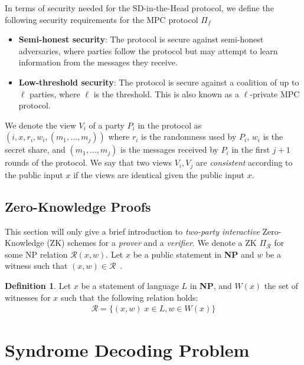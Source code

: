 \documentclass[twoside,11pt]{report}
\theoremstyle{definition}
\newtheorem{definition}{Definition}[section]
\theoremstyle{plain}
\begin{document}
In terms of security needed for the SD-in-the-Head protocol, we define the following security requirements for the MPC protocol $\Pi_f$

\begin{itemize}
  \item \textbf{Semi-honest security}: The protocol is secure against semi-honest adversaries, where parties follow the protocol but may attempt to learn information from the messages they receive.
  \item \textbf{Low-threshold security}: The protocol is secure against a coalition of up to $\ell$ parties, where $\ell$ is the threshold. This is also known as a $\ell$-private MPC protocol.
\end{itemize}

We denote the view $V_i$ of a party $P_i$ in the protocol as $(i, x, r_i, w_i, (m_1, \dots, m_j))$ where $r_i$ is the randomness used by $P_i$, $w_i$ is the secret share, and $(m_1, \dots, m_j)$ is the messages received by $P_i$ in the first $j+1$ rounds of the protocol. We say that two views $V_i, V_j$ are \textit{consistent} according to the public input $x$ if the views are identical given the public input $x$.

\subsection{Zero-Knowledge Proofs}\label{sec:zk}
This section will only give a brief introduction to \textit{two-party interactive} Zero-Knowledge (ZK) schemes for a \textit{prover} and a \textit{verifier}. We denote a ZK $\Pi_{\mathcal{R}}$ for some NP relation $\mathcal{R}(x, w)$. Let $x$ be a public statement in \textbf{NP} and $w$ be a witness such that $(x, w) \in \mathcal{R}$~\cite{feneuil2023threshold}.

\begin{definition}
  Let $x$ be a statement of language $L$ in \textbf{NP}, and $W(x)$ the set of witnesses for $x$ such that the following relation holds:
  \begin{align*}
    \mathcal{R} = \{(x, w)\; x \in L, w \in W(x){\}}
  \end{align*}
\end{definition}

\section{Syndrome Decoding Problem}\label{sec:syndrome}
\end{document}
